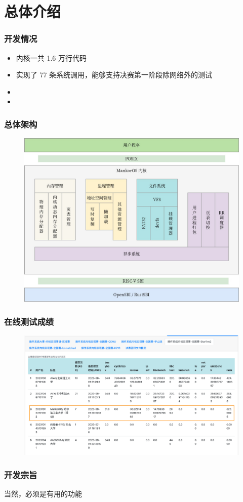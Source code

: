 \section{总体介绍}

\begin{frame}
    \frametitle{开发情况}

    \begin{itemize}
        \item 内核一共 1.6 万行代码
        \item 实现了 77 条系统调用，能够支持决赛第一阶段除网络外的测试
        \item {}
        \item {}
    \end{itemize}

\end{frame}

\begin{frame}
    \frametitle{总体架构}
    \begin{figure}
        \includegraphics[width=.6\textwidth]{assets/Arch.jpg}
    \end{figure}

\end{frame}

\begin{frame}
    \frametitle{在线测试成绩}
    \begin{figure}
        \centering
        \includegraphics[width=.7\textwidth]{assets/rank.png}
    \end{figure}

\end{frame}

\begin{frame}
    \frametitle{开发宗旨}

    \vfill
    \begin{center}
        \begin{LARGE}
        \end{LARGE}

        \hspace*{\fill}

        当然，必须是有用的功能
    \end{center}
    \vfill
\end{frame}